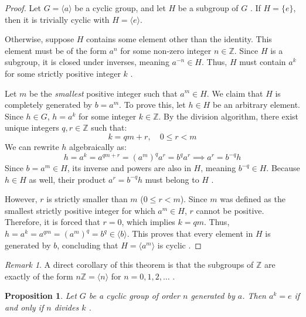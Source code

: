 \documentclass[11pt]{article}
\theoremstyle{definition}
\theoremstyle{plain}
\newtheorem{proposition}{Proposition}[theorem]
\theoremstyle{remark}
\newtheorem*{remark}{Remark}
\begin{document}
\begin{proof}
Let $G = \langle a \rangle$ be a cyclic group, and let $H$ be a subgroup of $G$ \cite{fraleigh}. If $H = \{e\}$, then it is trivially cyclic with $H = \langle e \rangle$. 

Otherwise, suppose $H$ contains some element other than the identity. This element must be of the form $a^n$ for some non-zero integer $n \in \mathbb{Z}$. Since $H$ is a subgroup, it is closed under inverses, meaning $a^{-n} \in H$. Thus, $H$ must contain $a^k$ for some strictly positive integer $k$ \cite{dummit}. 

Let $m$ be the \emph{smallest} positive integer such that $a^m \in H$. We claim that $H$ is completely generated by $b = a^m$. To prove this, let $h \in H$ be an arbitrary element. Since $h \in G$, $h = a^k$ for some integer $k \in \mathbb{Z}$. By the division algorithm, there exist unique integers $q, r \in \mathbb{Z}$ such that:
\begin{equation}
    k = qm + r, \quad 0 \le r < m
\end{equation}
We can rewrite $h$ algebraically as:
\begin{equation}
    h = a^k = a^{qm + r} = (a^m)^q a^r = b^q a^r \implies a^r = b^{-q} h
\end{equation}
Since $b = a^m \in H$, its inverse and powers are also in $H$, meaning $b^{-q} \in H$. Because $h \in H$ as well, their product $a^r = b^{-q} h$ must belong to $H$ \cite{gallian}. 

However, $r$ is strictly smaller than $m$ ($0 \le r < m$). Since $m$ was defined as the smallest strictly positive integer for which $a^m \in H$, $r$ cannot be positive. Therefore, it is forced that $r = 0$, which implies $k = qm$. 
Thus, $h = a^k = a^{qm} = (a^m)^q = b^q \in \langle b \rangle$. This proves that every element in $H$ is generated by $b$, concluding that $H = \langle a^m \rangle$ is cyclic \cite{dummit}.
\end{proof}

\begin{remark}
A direct corollary of this theorem is that the subgroups of $\mathbb{Z}$ are exactly of the form $n\mathbb{Z} = \langle n \rangle$ for $n = 0, 1, 2, \dots$ \cite{fraleigh}.
\end{remark}

\begin{proposition} \label{prop:cyclic_order}
Let $G$ be a cyclic group of order $n$ generated by $a$. Then $a^k = e$ if and only if $n$ divides $k$ \cite{gallian}.
\end{proposition}
\end{document}
